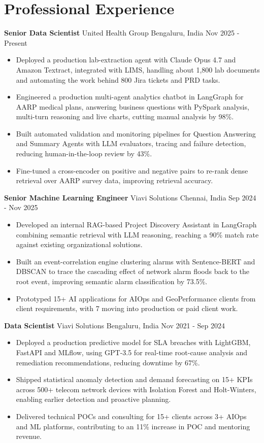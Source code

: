 \documentclass[10pt,a4paper]{article}
\newcommand{\role}[4]{\textbf{#1} \textbar{} #2 \hfill #3 \textbar{} #4\par}
\begin{document}
\section{Professional Experience}
\role{Senior Data Scientist}{United Health Group}{Bengaluru, India}{Nov 2025 - Present}
\begin{itemize}
  \item Deployed a production lab-extraction agent with Claude Opus 4.7 and Amazon Textract, integrated with LIMS, handling about 1,800 lab documents and automating the work behind 800 Jira tickets and PRD tasks.
  \item Engineered a production multi-agent analytics chatbot in LangGraph for AARP medical plans, answering business questions with PySpark analysis, multi-turn reasoning and live charts, cutting manual analysis by 98\%.
  \item Built automated validation and monitoring pipelines for Question Answering and Summary Agents with LLM evaluators, tracing and failure detection, reducing human-in-the-loop review by 43\%.
  \item Fine-tuned a cross-encoder on positive and negative pairs to re-rank dense retrieval over AARP survey data, improving retrieval accuracy.
\end{itemize}
\vspace{3pt}
\role{Senior Machine Learning Engineer}{Viavi Solutions}{Chennai, India}{Sep 2024 - Nov 2025}
\begin{itemize}
  \item Developed an internal RAG-based Project Discovery Assistant in LangGraph combining semantic retrieval with LLM reasoning, reaching a 90\% match rate against existing organizational solutions.
  \item Built an event-correlation engine clustering alarms with Sentence-BERT and DBSCAN to trace the cascading effect of network alarm floods back to the root event, improving semantic alarm classification by 73.5\%.
  \item Prototyped 15+ AI applications for AIOps and GeoPerformance clients from client requirements, with 7 moving into production or paid client work.
\end{itemize}
\vspace{3pt}
\role{Data Scientist}{Viavi Solutions}{Bengaluru, India}{Nov 2021 - Sep 2024}
\begin{itemize}
  \item Deployed a production predictive model for SLA breaches with LightGBM, FastAPI and MLflow, using GPT-3.5 for real-time root-cause analysis and remediation recommendations, reducing downtime by 67\%.
  \item Shipped statistical anomaly detection and demand forecasting on 15+ KPIs across 500+ telecom network devices with Isolation Forest and Holt-Winters, enabling earlier detection and proactive planning.
  \item Delivered technical POCs and consulting for 15+ clients across 3+ AIOps and ML platforms, contributing to an 11\% increase in POC and mentoring revenue.
\end{itemize}
\end{document}
